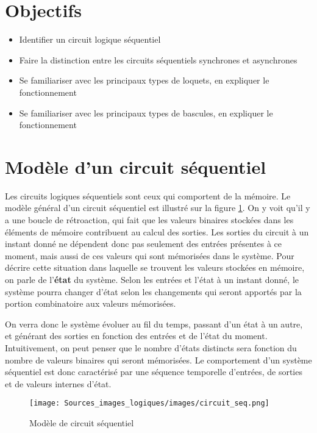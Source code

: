 \documentclass[letter, oneside]{book}
\begin{document}
\section{Objectifs}
\label{sec:org1f08a2b}
\begin{itemize}
\item Identifier un circuit logique séquentiel
\item Faire la distinction entre les circuits séquentiels synchrones et asynchrones
\item Se familiariser avec les principaux types de loquets, en expliquer
le fonctionnement
\item Se familiariser avec les principaux types de bascules, en expliquer
le fonctionnement
\end{itemize}

\section{Modèle d'un circuit séquentiel}
\label{sec:org8859d4f}

Les circuits logiques séquentiels sont ceux qui comportent de la
mémoire. Le modèle général d'un circuit séquentiel est illustré sur la
figure \ref{fig:org77744a2}. On y voit qu'il y a une boucle de rétroaction,
qui fait que les valeurs binaires stockées dans les éléments de
mémoire contribuent au calcul des sorties. Les sorties du circuit à un
instant donné ne dépendent donc pas seulement des entrées présentes à
ce moment, mais aussi de ces valeurs qui sont mémorisées dans le
système. Pour décrire cette situation dans laquelle se trouvent les
valeurs stockées en mémoire, on parle de l'\textbf{état} du système. Selon
les entrées et l'état à un instant donné, le système pourra changer
d'état selon les changements qui seront apportés par la portion
combinatoire aux valeurs mémorisées.

On verra donc le système évoluer au fil du temps, passant d'un état à
un autre, et générant des sorties en fonction des entrées et de l'état
du moment. Intuitivement, on peut penser que le nombre d'états
distincts sera fonction du nombre de valeurs binaires qui seront
mémorisées. Le comportement d'un système séquentiel est donc
caractérisé par une séquence temporelle d'entrées, de sorties et de
valeurs internes d'état.

\begin{figure}[htbp]
\centering
\texttt{[image: Sources\_images\_logiques/images/circuit\_seq.png]}
\caption{\label{fig:org77744a2}Modèle de circuit séquentiel}
\end{figure}
\end{document}
